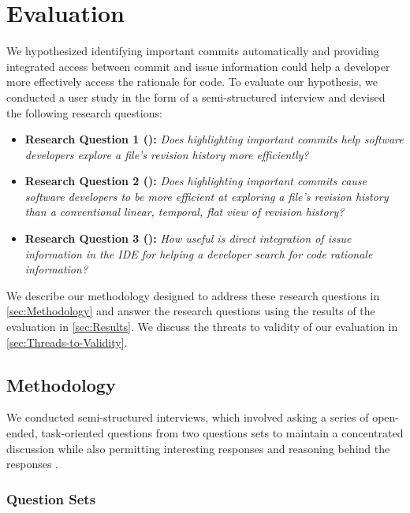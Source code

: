 \chapter{Evaluation}
\label{ch:Evaluation}

We hypothesized identifying important commits automatically and providing integrated access between commit and issue information could help a developer more effectively access the rationale for code.
To evaluate our hypothesis, we conducted a user study in the form of a semi-structured interview and devised the following research questions:

\begin{itemize}[leftmargin=*]
    \item[] \label{itm:RQ1} \textbf{Research Question 1 ():} \textit{Does highlighting important commits help software developers explore a file’s revision history more efficiently?}
    \item[] \label{itm:RQ2} \textbf{Research Question 2 ():} \textit{Does highlighting important commits cause software developers to be more efficient at exploring a file’s revision history than a conventional linear, temporal, flat view of revision history?}
    \item[] \label{itm:RQ3} \textbf{Research Question 3 ():} \textit{How useful is direct integration of issue information in the IDE for helping a developer search for code rationale information?}
  \end{itemize}

We describe our methodology designed to address these research questions in \autoref{sec:Methodology} and answer the research questions using the results of the evaluation in \autoref{sec:Results}.
We discuss the threats to validity of our evaluation in \autoref{sec:Threads-to-Validity}.

\section{Methodology}
\label{sec:Methodology}

We conducted semi-structured interviews, which involved asking a series of open-ended, task-oriented questions from two questions sets to maintain a concentrated discussion while also permitting
interesting responses and reasoning behind the responses \cite{shull_guide_2007}.

\subsection{Question Sets}

